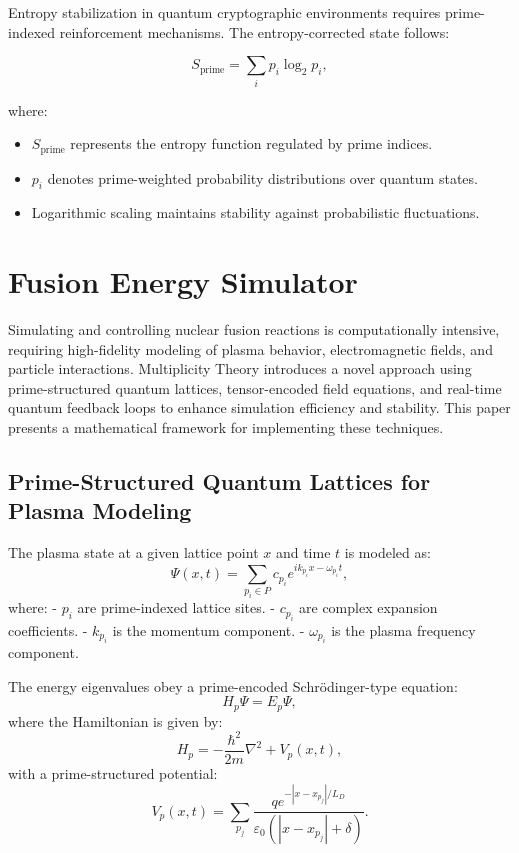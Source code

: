 \documentclass{article}
\theoremstyle{plain}
\begin{document}
Entropy stabilization in quantum cryptographic environments requires prime-indexed reinforcement mechanisms. The entropy-corrected state follows:

\begin{equation}
S_{\text{prime}} = \sum_{i} p_i \log_2 p_i,
\end{equation}

where:
\begin{itemize}
    \item $S_{\text{prime}}$ represents the entropy function regulated by prime indices.
    \item $p_i$ denotes prime-weighted probability distributions over quantum states.
    \item Logarithmic scaling maintains stability against probabilistic fluctuations.
\end{itemize}

\section{Fusion Energy Simulator}
Simulating and controlling nuclear fusion reactions is computationally intensive, requiring high-fidelity modeling of plasma behavior, electromagnetic fields, and particle interactions. Multiplicity Theory introduces a novel approach using prime-structured quantum lattices, tensor-encoded field equations, and real-time quantum feedback loops to enhance simulation efficiency and stability. This paper presents a mathematical framework for implementing these techniques.

\subsection{Prime-Structured Quantum Lattices for Plasma Modeling}

The plasma state at a given lattice point $x$ and time $t$ is modeled as:
\begin{equation}
    \Psi(x, t) = \sum_{p_i \in P} c_{p_i} e^{i k_{p_i} x - \omega_{p_i} t},
\end{equation}
where:
- $p_i$ are prime-indexed lattice sites.
- $c_{p_i}$ are complex expansion coefficients.
- $k_{p_i}$ is the momentum component.
- $\omega_{p_i}$ is the plasma frequency component.

The energy eigenvalues obey a prime-encoded Schr\"odinger-type equation:
\begin{equation}
    H_p \Psi = E_p \Psi,
\end{equation}
where the Hamiltonian is given by:
\begin{equation}
    H_p = -\frac{\hbar^2}{2m} \nabla^2 + V_p(x, t),
\end{equation}
with a prime-structured potential:
\begin{equation}
    V_p(x, t) = \sum_{p_j} \frac{q e^{-|x-x_{p_j}|/L_D}}{\varepsilon_0 (|x-x_{p_j}| + \delta)}.
\end{equation}
\end{document}
